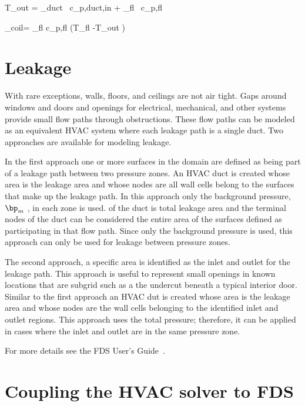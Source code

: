 \be T_{\rm out} = 
                             {_{\rm duct} \, c_{p,{\rm duct,in}} + _{\rm fl} \, c_{p,{\rm fl}} } \ee

\be {}_{\rm coil}= _{\rm fl} c_{p,{\rm fl}} \left(T_{\rm fl} -T_{\rm out} \right) \eta \ee

\section{Leakage}

With rare exceptions, walls, floors, and ceilings are not air tight.  Gaps around windows and doors and openings for electrical, mechanical, and other systems provide small flow paths through obstructions.  These flow paths can be modeled as an equivalent HVAC system where each leakage path is a single duct.  Two approaches are available for modeling leakage.

In the first approach one or more surfaces in the domain are defined as being part of a leakage path between two pressure zones. An HVAC duct is created whose area is the leakage area and whose nodes are all wall cells belong to the surfaces that make up the leakage path. In this approach only the background pressure, $\bp_m$ , in each zone is used. of the duct is total leakage area and the terminal nodes of the duct can be considered the entire area of the surfaces defined as participating in that flow path. Since only the background pressure is used, this approach can only be used for leakage between pressure zones. 

The second approach, a specific area is identified as the inlet and outlet for the leakage path. This approach is useful to represent small openings in known locations that are subgrid such as a the undercut beneath a typical interior door. Similar to the first approach an HVAC dut is created whose area is the leakage area and whose nodes are the wall cells belonging to the identified inlet and outlet regions. This approach uses the total pressure; therefore, it can be applied in cases where the inlet and outlet are in the same pressure zone. 

For more details see the FDS User's Guide~\cite{FDS_Users_Guide}.

\newpage
\section{Coupling the HVAC solver to FDS}


